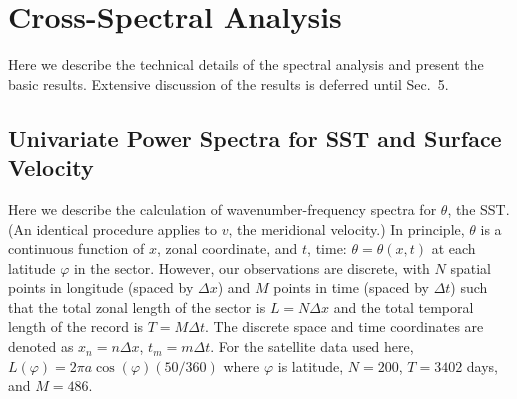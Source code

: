 \documentclass[10pt]{article}
\begin{document}

\section{Cross-Spectral Analysis}

Here we describe the technical details of the spectral analysis and present the basic results. Extensive discussion of the results is deferred until Sec.~5.

\subsection{Univariate Power Spectra for SST and Surface Velocity}

Here we describe the calculation of wavenumber-frequency spectra for $\theta$, the SST. (An identical procedure applies to $v$, the meridional velocity.) In principle, $\theta$ is a continuous function of $x$, zonal coordinate, and $t$, time: $\theta = \theta(x,t)$ at each latitude $\varphi$ in the sector. However, our observations are discrete, with $N$ spatial points in longitude (spaced by $\Delta x$) and $M$ points in time (spaced by $\Delta t$) such that the total zonal length of the sector is $L = N \Delta x$ and the total temporal length of the record is $T = M \Delta t$. The discrete space and time coordinates are denoted as $x_n = n \Delta x$, $t_m = m \Delta t$. For the satellite data used here, $L(\varphi) = 2 \pi a \cos(\varphi) (50/360)$ where $\varphi$ is latitude, $N = 200$, $T = 3402$ days, and $M = 486$.
\end{document}

